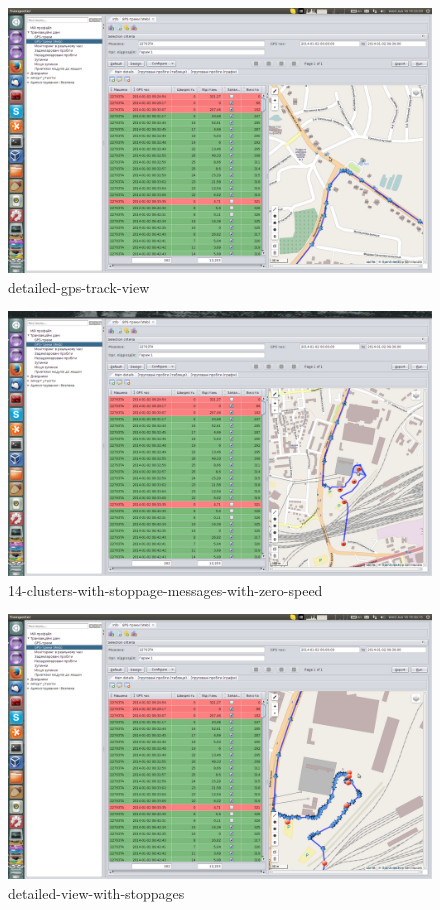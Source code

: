 \begin{figure}[!htp]
\centering
\includegraphics[width=16cm]{chapters/02-gpstracks/images/13-detailed-gps-track-view.png}
\caption{detailed-gps-track-view}\label{fig:13}
\end{figure}

\begin{figure}[!htp]
\centering
\includegraphics[width=16cm]{chapters/02-gpstracks/images/14-clusters-with-stoppage-messages-with-zero-speed.png}
\caption{14-clusters-with-stoppage-messages-with-zero-speed}\label{fig:14}
\end{figure}

\begin{figure}[!htp]
\centering
\includegraphics[width=16cm]{chapters/02-gpstracks/images/15-detailed-view-with-stoppages.png}
\caption{detailed-view-with-stoppages}\label{fig:15}
\end{figure}

